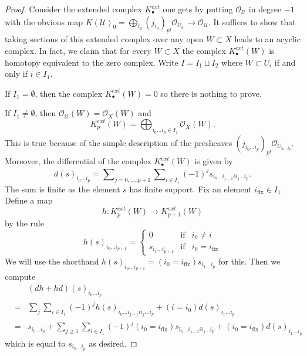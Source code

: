 \begin{proof}
Consider the extended complex $K^{ext}_\bullet$ one gets by putting
$\mathcal{O}_{\mathcal{U}}$ in degree $-1$ with the obvious map
$K(\mathcal{U})_0 =
\bigoplus_{i_0} (j_{i_0})_{p!}\mathcal{O}_{U_{i_0}} \to
\mathcal{O}_{\mathcal{U}}$.
It suffices to show that taking sections of this extended complex over
any open $W \subset X$ leads to an acyclic complex.
In fact, we claim that for every $W \subset X$ the complex
$K^{ext}_\bullet(W)$ is homotopy equivalent to the zero complex.
Write $I = I_1 \sqcup I_2$ where $W \subset U_i$ if and only
if $i \in I_1$.

\medskip\noindent
If $I_1 = \emptyset$, then the complex $K^{ext}_\bullet(W) = 0$ so there is
nothing to prove.

\medskip\noindent
If $I_1 \not = \emptyset$, then
$\mathcal{O}_{\mathcal{U}}(W) = \mathcal{O}_X(W)$
and
$$
K^{ext}_p(W) =
\bigoplus\nolimits_{i_0 \ldots i_p \in I_1} \mathcal{O}_X(W).
$$
This is true because of the simple description of the presheaves
$(j_{i_0 \ldots i_p})_{p!}\mathcal{O}_{U_{i_0 \ldots i_p}}$.
Moreover, the differential of the complex $K^{ext}_\bullet(W)$
is given by
$$
d(s)_{i_0 \ldots i_p} =
\sum\nolimits_{j = 0, \ldots, p + 1} \sum\nolimits_{i \in I_1}
(-1)^j s_{i_0 \ldots i_{j - 1} i i_j \ldots i_p}.
$$
The sum is finite as the element $s$ has finite support.
Fix an element $i_{\text{fix}} \in I_1$. Define a map
$$
h : K^{ext}_p(W) \longrightarrow K^{ext}_{p + 1}(W)
$$
by the rule
$$
h(s)_{i_0 \ldots i_{p + 1}} =
\left\{
\begin{matrix}
0 & \text{if} & i_0 \not = i \\
s_{i_1 \ldots i_{p + 1}} & \text{if} & i_0 = i_{\text{fix}}
\end{matrix}
\right.
$$
We will use the shorthand
$h(s)_{i_0 \ldots i_{p + 1}} = (i_0 = i_{\text{fix}}) s_{i_1 \ldots i_p}$
for this. Then we compute
\begin{eqnarray*}
& & (dh + hd)(s)_{i_0 \ldots i_p} \\
& = &
\sum_j \sum_{i \in I_1} (-1)^j h(s)_{i_0 \ldots i_{j - 1} i i_j \ldots i_p}
+
(i = i_0) d(s)_{i_1 \ldots i_p} \\
& = &
s_{i_0 \ldots i_p} +
\sum_{j \geq 1}\sum_{i \in I_1}
(-1)^j (i_0 = i_{\text{fix}}) s_{i_1 \ldots i_{j - 1} i i_j \ldots i_p}
+
(i_0 = i_{\text{fix}}) d(s)_{i_1 \ldots i_p}
\end{eqnarray*}
which is equal to $s_{i_0 \ldots i_p}$ as desired.
\end{proof}

